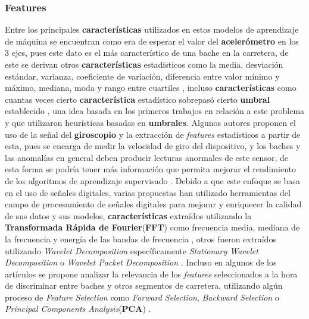 		\subsubsection{Features}
			Entre los principales \textbf{características} utilizados en estos modelos de aprendizaje de máquina se encuentran como era de esperar el valor 
			del \textbf{acelerómetro} en los 3 ejes, pues este dato es el más característico de una bache en la carretera, de este se derivan otros
			\textbf{características} estadísticos como la media, desviación estándar, varianza, coeficiente de variación, diferencia entre valor mínimo y
			máximo, mediana, moda y rango entre cuartiles , incluso \textbf{características} como cuantas veces cierto \textbf{característica} estadístico sobrepasó cierto \textbf{umbral}
			establecido , una idea basada en los primeros trabajos en relación a este problema y que utilizaron
			heurísticas basadas en \textbf{umbrales}. Algunos autores proponen el uso de la señal del \textbf{giroscopio} y la extracción de \emph
			{features} estadísticos a partir de esta, pues se encarga de medir la velocidad de giro del dispositivo, y los baches y las anomalías
			en general deben producir lecturas anormales de este sensor, de esta forma se podría tener más información que permita mejorar el
			rendimiento de los algoritmos de aprendizaje supervisado . Debido a que este enfoque
			se basa en el uso de señales digitales, varias propuestas han utilizado herramientas del campo de procesamiento de señales digitales
			para mejorar y enriquecer la calidad de sus datos y sus modelos, \textbf{características} extraídos utilizando la \textbf{Transformada Rápida
			de Fourier}(\textbf{FFT}) como frecuencia media, mediana de la frecuencia y energía de las bandas de frecuencia , otros fueron extraídos utilizando \emph{Wavelet Decomposition} específicamente \emph{Stationary Wavelet
			Decomposition}  o \emph{Wavelet Packet Decomposition} . Incluso en algunos de
			los artículos se propone analizar la relevancia de los \emph {features} seleccionados a la hora de discriminar entre baches y otros
			segmentos de carretera, utilizando algún proceso de \emph{Feature Selection} como \emph{Forward Selection}, \emph{Backward Selection}
			o \emph{Principal Components Analysis}(\textbf{PCA}) .

